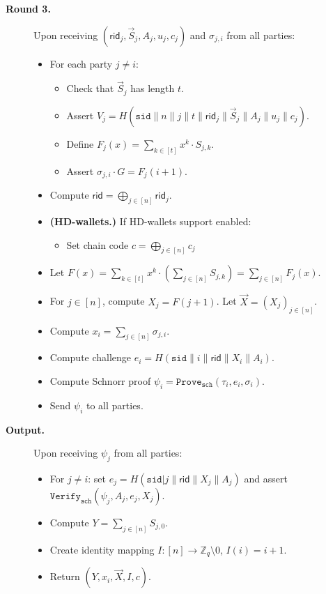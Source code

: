 \documentclass[11pt]{article}
\newcommand{\sid}{\ensuremath{\mathtt{sid}}}
\newcommand{\prove}[1]{\ensuremath{\mathtt{Prove}_{\mathtt{#1}}}}
\newcommand{\verify}[1]{\ensuremath{\mathtt{Verify}_{\mathtt{#1}}}}
\newcommand{\rid}{\textsf{rid}}
\newcommand{\Z}{\mathbb{Z}}
\newcommand{\?}[1]{\stackrel{?}{#1}}
\begin{document}
\begin{description}
  \item[\textbf{Round 3.}] 
    Upon receiving $(\rid_j, \vec{S}_j, A_j, u_j, c_j)$ and $\sigma_{j,i}$ from all parties:
    \begin{itemize}
      \item For each party $j \neq i$:
        \begin{itemize}
        \item Check that $\vec{S}_j$ has length $t$.
        \item Assert $V_j = H(\sid\| n\| j\| t\| \rid_j\| \vec{S}_j\| A_j\| u_j \| c_j)$.
        \item Define 
          $F_j(x) = \sum_{k \in [t]} x^k \cdot S_{j,k}$.
        \item Assert $\sigma_{j,i} \cdot G  = F_j(i + 1)$.
        \end{itemize}
        \item Compute $\rid = \bigoplus_{j \in [n]} \rid_j$.
        \item {\bf (HD-wallets.)} If HD-wallets support enabled:
        \begin{itemize}
          \item Set chain code $c = \bigoplus_{j \in [n]} c_j$
        \end{itemize}
        \item Let $F(x) = \sum_{k \in [t]} x^k \cdot \left(\sum_{j\in [n]} S_{j,k}\right) = \sum_{j \in [n]} F_j(x)$. 
        \item   For $j \in [n]$, compute
            $X_j = F(j + 1)$. 
            Let $\vec{X} = (X_j)_{j \in [n]}$.
      \item Compute $x_i = \sum_{j \in [n]} \sigma_{j,i}$.
      \item Compute challenge $e_i = H(\sid\| i\| \rid\| X_i\| A_i)$.
      \item Compute Schnorr proof $\psi_i = \prove{sch}(\tau_i, e_i, \sigma_i)$.
      \item Send $\psi_i$ to all parties.
    \end{itemize}

  \item[\textbf{Output.}] 
  Upon receiving $\psi_j$ from all parties:
    \begin{itemize}
      \item For $j \neq i$:
      set $e_j = H(\sid| j\| \rid\| X_j\| A_j)$ and 
      assert $\verify{sch}(\psi_j, A_j, e_j, X_j)$.
      \item Compute $Y = \sum_{j \in [n]} S_{j,0}$.
      \item Create identity mapping $I : [n] \to \Z_q \setminus 0$,
        $I(i) = i + 1$.
      \item Return $(Y, x_i, \vec{X}, I, c)$.
    \end{itemize}

\end{description}
\end{document}
